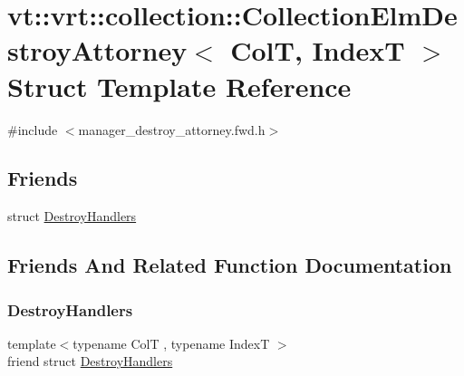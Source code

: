 \hypertarget{structvt_1_1vrt_1_1collection_1_1_collection_elm_destroy_attorney}{}\section{vt\+:\+:vrt\+:\+:collection\+:\+:Collection\+Elm\+Destroy\+Attorney$<$ ColT, IndexT $>$ Struct Template Reference}
\label{structvt_1_1vrt_1_1collection_1_1_collection_elm_destroy_attorney}


{\ttfamily \#include $<$manager\+\_\+destroy\+\_\+attorney.\+fwd.\+h$>$}

\subsection*{Friends}
\begin{DoxyCompactItemize}
\item 
struct \hyperlink{structvt_1_1vrt_1_1collection_1_1_collection_elm_destroy_attorney_ab072692eaf0bed072206c6c8119b79ea}{Destroy\+Handlers}
\end{DoxyCompactItemize}


\subsection{Friends And Related Function Documentation}
\mbox{\label{structvt_1_1vrt_1_1collection_1_1_collection_elm_destroy_attorney_ab072692eaf0bed072206c6c8119b79ea}} 
\subsubsection{\texorpdfstring{Destroy\+Handlers}{DestroyHandlers}}
{\footnotesize\ttfamily template$<$typename ColT , typename IndexT $>$ \\
friend struct \hyperlink{structvt_1_1vrt_1_1collection_1_1_destroy_handlers}{Destroy\+Handlers}\hspace{0.3cm}{\ttfamily [friend]}}



